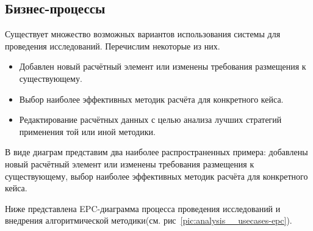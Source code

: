 \subsection{\Large{Бизнес-процессы}}

Существует множество возможных вариантов использования системы для проведения исследований.
Перечислим некоторые из них.
\begin{itemize}
	\item Добавлен новый расчётный элемент или изменены требования размещения к существующему.
	\item Выбор наиболее эффективных методик расчёта для конкретного кейса.
	\item Редактирование расчётных данных с целью анализа лучших стратегий применения той или иной методики.
\end{itemize}

В виде диаграм представим два наиболее распространенных примера: добавлены новый расчётный элемент
или изменены требования размещения к существующему, выбор наиболее эффективных методик расчёта для конкретного кейса.

Ниже представлена EPC-диаграмма процесса проведения исследований и
внедрения алгоритмической методики(см. рис\ \ref{pic:analysis__usecases-epc}).

